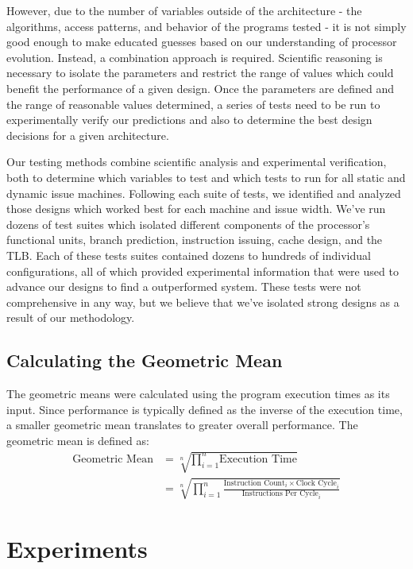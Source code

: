 \documentclass[paper=a4, fontsize=12pt]{scrartcl} %
\numberwithin{equation}{section} %
\numberwithin{figure}{section} %
\numberwithin{table}{section} %
\begin{document}
However, due to the number of variables outside of the architecture - the algorithms, access patterns, and behavior of the programs tested - it is not simply good enough to make educated guesses based on our understanding of processor evolution. Instead, a combination approach is required. Scientific reasoning is necessary to isolate the parameters and restrict the range of values which could benefit the performance of a given design. Once the parameters are defined and the range of reasonable values determined, a series of tests need to be run to experimentally verify our predictions and also to determine the best design decisions for a given architecture.

Our testing methods combine scientific analysis and experimental verification, both to determine which variables to test and which tests to run for all static and dynamic issue machines. Following each suite of tests, we identified and analyzed those designs which worked best for each machine and issue width. We've run dozens of test suites which isolated different components of the processor's functional units, branch prediction, instruction issuing, cache design, and the TLB. Each of these tests suites contained dozens to hundreds of individual configurations, all of which provided experimental information that were used to advance our designs to find a outperformed system. These tests were not comprehensive in any way, but we believe that we've isolated strong designs as a result of our methodology.

\subsection{Calculating the Geometric Mean}

The geometric means were calculated using the program execution times as its input. Since performance is typically defined as the inverse of the execution time, a smaller geometric mean translates to greater overall performance. The geometric mean is defined as:
\begin{align*}
	\text{Geometric Mean} &= \sqrt[n] {\prod_{i=1}^{n} \text{Execution Time}} \\
	&= \sqrt[n] {\prod_{i=1}^{n} \frac{\text{Instruction Count}_i \times \text{Clock Cycle}_i}{\text{Instructions Per Cycle}_i}} 
\end{align*}


\section{Experiments}
\end{document}
